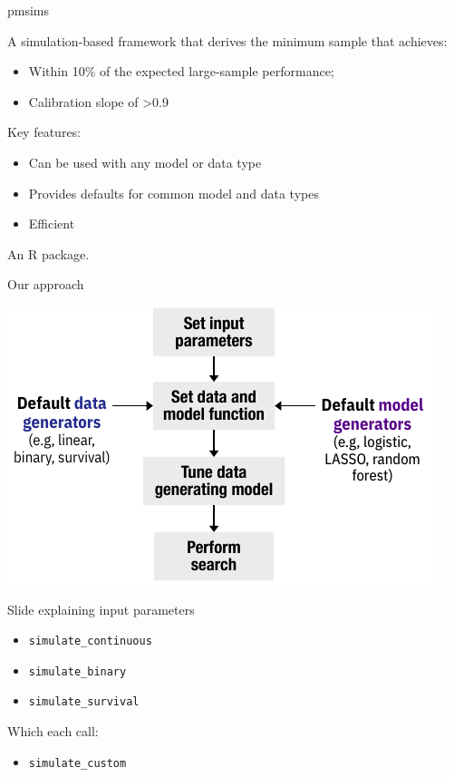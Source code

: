 \documentclass[11pt]{beamer}
\newcommand{\gap}{\vspace{0.8em}}
\begin{document}
\begin{frame}{pmsims}

	A simulation-based framework that derives the minimum sample that
	achieves:

	\begin{itemize}
		\item Within 10\% of the expected large-sample performance;
		\item Calibration slope of >0.9
	\end{itemize}

	\gap

	Key features:

	\begin{itemize}
		\item Can be used with any model or data type
		\item Provides defaults for common model and data types
		\item Efficient
	\end{itemize}

	\gap
	An R package.

\end{frame}

\begin{frame}[c]{Our approach}

    \includegraphics[width=\textwidth]{figures/workflow1.pdf}

\end{frame}

\begin{frame}[t]{Slide explaining input parameters}

	\begin{itemize}
		\item \texttt{simulate\_continuous}
		\item \texttt{simulate\_binary}
		\item \texttt{simulate\_survival}
	\end{itemize}

	Which each call:

	\begin{itemize}
		\item \texttt{simulate\_custom}
	\end{itemize}

\end{frame}
\end{document}
